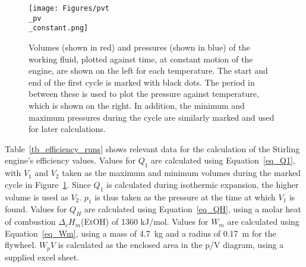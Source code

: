 \documentclass[titlepage]{article}
\begin{document}
\begin{figure}[H]
    \centering
    \texttt{[image: Figures/pvt\\\_pv\\\_constant.png]}
    \caption{Volumes (shown in red) and pressures (shown in blue) of the working fluid, plotted against time, at constant motion of the engine, are shown on the left for each temperature. The start and end of the first cycle is marked with black dots. The period in between these is used to plot the pressure against temperature, which is shown on the right. In addition, the minimum and maximum pressures during the cycle are similarly marked and used for later calculations.}
    \label{fig_constant_pvt_pv}
\end{figure}

\newpage
\noindent Table~\ref{tb_efficiency_runs} shows relevant data for the calculation of the Stirling engine's efficiency values. Values for \(Q_1\) are calculated using Equation~\ref{eq_Q1}, with \(V_1\) and \(V_2\) taken as the maximum and minimum volumes during the marked cycle in Figure~\ref{fig_constant_pvt_pv}. Since \(Q_1\) is calculated during isothermic expansion, the higher volume is used as \(V_2\). \(p_1\) is thus taken as the pressure at the time at which \(V_1\) is found. Values for \(Q_H\) are calculated using Equation~\ref{eq_QH}, using a molar heat of combustion \(\Delta_c H_m\)(EtOH) of 1360 kJ/mol. Values for \(W_m\) are calculated using Equation~\ref{eq_Wm}, using a mass of 4.7~kg and a radius of 0.17~m for the flywheel. \(W_pV\) is calculated as the enclosed area in the p/V diagram, using a supplied excel sheet.
\end{document}

